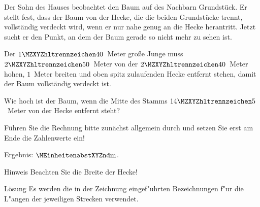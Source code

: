 \begin{MExercises}
\begin{MExercise}
Der Sohn des Hauses beobachtet den Baum auf des Nachbarn Grundst\"uck. Er 
stellt fest, dass der Baum von der Hecke, die die beiden Grundst\"ucke trennt,
vollst\"andig verdeckt wird, wenn er nur nahe genug an die Hecke herantritt.
Jetzt sucht er den Punkt, an dem der Baum gerade so nicht mehr zu sehen ist.

Der $\MZahl{1}{40}$~Meter gro\ss e Junge muss $\MZahl{2}{50}$~Meter von der 
$\MZahl{2}{40}$~Meter hohen, $1$~Meter breiten und oben spitz zulaufenden 
Hecke entfernt stehen, damit der Baum vollst\"andig verdeckt ist.

Wie hoch ist der Baum, wenn die Mitte des Stamms $\MZahl{14}{5}$~Meter von 
der Hecke entfernt steht?

F\"uhren Sie die Rechnung bitte zun\"achst allgemein durch und setzen Sie erst
am Ende die Zahlenwerte ein!

Ergebnis:  $\MEinheit{m}$.

\begin{MHint}{Hinweis}
Beachten Sie die Breite der Hecke!
\end{MHint}

\begin{MHint}{L\"osung}
Es werden die in der Zeichnung eingef"uhrten Bezeichnungen f"ur die L"angen 
der jeweiligen Strecken verwendet.


\end{MHint}
\end{MExercise}
\end{MExercises}
